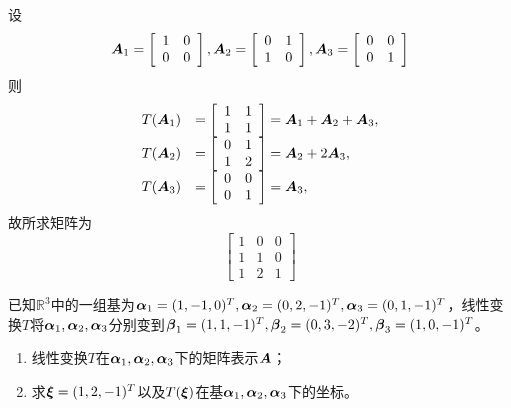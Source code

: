 \begin{frame}
  \begin{jie}
    设$$\boldsymbol{A}_1=\left[
      \begin{array}{cc}
        1&0\\
        0&0
      \end{array}
    \right],\boldsymbol{A}_2=\left[
      \begin{array}{cc}
        0&1\\
        1&0
      \end{array}
    \right],\boldsymbol{A}_3=\left[
      \begin{array}{cc}
        0&0\\
        0&1
      \end{array}
    \right]
    $$
    则
    $$
    \begin{array}{rl}
      T(\boldsymbol{A}_1)&=
      \left[
      \begin{array}{cc}
        1&1\\
        1&1
      \end{array}
      \right]=\boldsymbol{A}_1+\boldsymbol{A}_2+\boldsymbol{A}_3, \\
      T(\boldsymbol{A}_2)&=\left[
      \begin{array}{cc}
        0&1\\
        1&2
      \end{array}
           \right]=\boldsymbol{A}_2+2\boldsymbol{A}_3, \\
      T(\boldsymbol{A}_3)&=\left[
      \begin{array}{cc}
        0&0\\
        0&1
      \end{array}
           \right]=\boldsymbol{A}_3,
    \end{array}
    $$
    故所求矩阵为
    $$
    \left[
      \begin{array}{ccc}
        1&0&0\\
        1&1&0\\
        1&2&1
      \end{array}
    \right]
    $$
  \end{jie}
\end{frame}


\begin{frame}
  \begin{li}
    已知$\mathbb R^3$中的一组基为$\boldsymbol{\alpha}_1=(1,-1,0)^T,\boldsymbol{\alpha}_2=(0,2,-1)^T,\boldsymbol{\alpha}_3=(0,1,-1)^T$，线性变换$T$将$\boldsymbol{\alpha}_1,\boldsymbol{\alpha}_2,\boldsymbol{\alpha}_3$分别变到$\boldsymbol{\beta}_1=(1,1,-1)^T,\boldsymbol{\beta}_2=(0,3,-2)^T,\boldsymbol{\beta}_3=(1,0,-1)^T$。
    \begin{enumerate}
    \item 线性变换$T$在$\boldsymbol{\alpha}_1,\boldsymbol{\alpha}_2,\boldsymbol{\alpha}_3$下的矩阵表示$\boldsymbol{A}$；
    \item 求$\boldsymbol{\xi}=(1,2,-1)^T$以及$T(\boldsymbol{\xi})$在基$\boldsymbol{\alpha}_1,\boldsymbol{\alpha}_2,\boldsymbol{\alpha}_3$下的坐标。
    \end{enumerate}
  \end{li} 
\end{frame}

